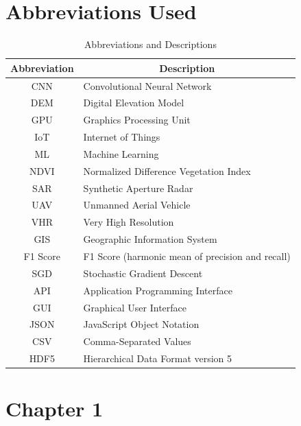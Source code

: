 \documentclass[12pt,a4paper]{report}
\begin{document}
			\chapter*{\centering Abbreviations Used }
		\label{Abbreviations Used}
\begin{table}[h]
    \centering
    \begin{tabular}{|c|p{10cm}|}
    \hline
    \multicolumn{1}{|c|}{\textbf{Abbreviation}} & \multicolumn{1}{c|}{\textbf{Description}} \\
        \hline
        CNN & Convolutional Neural Network \\
\hline
DEM & Digital Elevation Model \\
\hline
GPU & Graphics Processing Unit \\
\hline
IoT & Internet of Things \\
\hline
ML & Machine Learning \\
\hline
NDVI & Normalized Difference Vegetation Index \\
\hline
SAR & Synthetic Aperture Radar \\
\hline
UAV & Unmanned Aerial Vehicle \\
\hline
VHR & Very High Resolution \\
\hline
GIS & Geographic Information System \\
\hline
F1 Score & F1 Score (harmonic mean of precision and recall) \\
\hline
SGD & Stochastic Gradient Descent \\
\hline
API & Application Programming Interface \\
\hline
GUI & Graphical User Interface \\
\hline
JSON & JavaScript Object Notation \\
\hline
CSV & Comma-Separated Values \\
\hline
HDF5 & Hierarchical Data Format version 5 \\
\hline
    \end{tabular}
    \caption{Abbreviations and Descriptions}
    \label{tab:abbreviations}
\end{table}
	\renewcommand{\thesection}{\arabic{section}}
	\newpage
	{\vfill \chapter*{\centering \vfill Chapter 1 \vfill}\vfill}
	\thispagestyle{empty}
	\newpage

	\label{Introduction}
\end{document}
